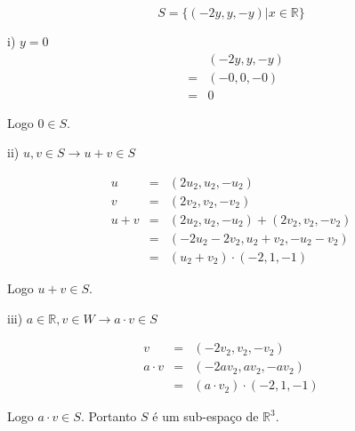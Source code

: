 \documentclass[11pt]{article}
\newenvironment{question}[1]
  {\par\addvspace{\medskipamount}
   \noindent\makebox[0pt][r]{\textbf{#1)} }\ignorespaces}
  {\par\addvspace{\medskipamount}}
\begin{document}
\begin{question}{3}
$$S = \{(-2y,y,-y)|x \in \mathbb{R}\}$$

i) $y = 0$
$$
\begin{array}{rcl}
    &  &(-2y,y,-y)\\
    &= &(-0,0,-0)\\
    &= &0
\end{array}
$$

Logo $0 \in S$.

\bigskip
ii) $u,v \in S \rightarrow u+v \in S$

$$
\begin{array}{rcl}
    u &= &(2u_2,u_2,-u_2)\\
    v &= &(2v_2,v_2,-v_2)\\
    u + v &= &(2u_2,u_2,-u_2) + (2v_2,v_2,-v_2)\\
          &= &(-2u_2-2v_2,u_2+v_2,-u_2-v_2)\\
          &= &(u_2+v_2) \cdot (-2,1,-1)
\end{array}
$$

Logo $u + v \in S$.

\bigskip
iii) $a \in \mathbb{R}, v \in W \rightarrow a \cdot v \in S$

$$
\begin{array}{rcl}
    v &= &(-2v_2,v_2,-v_2)\\
    a \cdot v &= &(-2a v_2,a v_2,-a v_2)\\
          &= &(a \cdot v_2) \cdot (-2,1,-1)
\end{array}
$$

Logo $a \cdot v \in S$. Portanto $S$ é um sub-espaço de $\mathbb{R}^3$.

\end{question}
\end{document}
